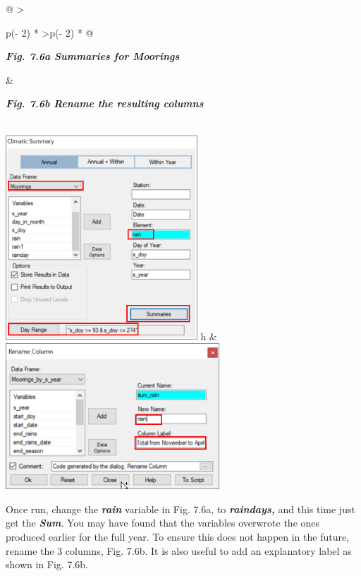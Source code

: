 \documentclass[
  letterpaper,
  DIV=11,
  numbers=noendperiod]{scrreprt}
\begin{document}
\begin{longtable}[]{@{}
  >{\raggedright\arraybackslash}p{(\columnwidth - 2\tabcolsep) * }
  >{\raggedleft\arraybackslash}p{(\columnwidth - 2\tabcolsep) * }@{}}
\toprule\noalign{}
\begin{minipage}[b]{\linewidth}\raggedright
\textbf{\emph{Fig. 7.6a Summaries for Moorings}}
\end{minipage} & \begin{minipage}[b]{\linewidth}\raggedleft
\textbf{\emph{Fig. 7.6b Rename the resulting columns}}
\end{minipage} \\
\midrule\noalign{}
\endhead
\bottomrule\noalign{}
\endlastfoot
\includegraphics[width=2.83063in,height=3.03142in]{figures/Fig7.6a.png}
h &
\includegraphics[width=3.15657in,height=\textheight]{figures/Fig7.6b.png} \\
\end{longtable}

Once run, change the \textbf{\emph{rain}} variable in Fig. 7.6a, to
\textbf{\emph{raindays,}} and this time just get the
\textbf{\emph{Sum}}. You may have found that the variables overwrote the
ones produced earlier for the full year. To ensure this does not happen
in the future, rename the 3 columns, Fig. 7.6b. It is also useful to add
an explanatory label as shown in Fig. 7.6b.
\end{document}
